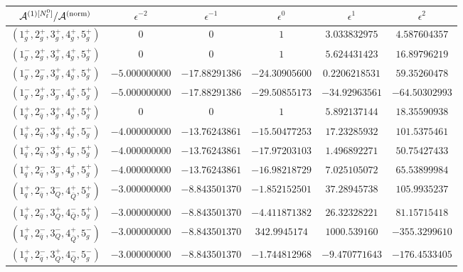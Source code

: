 \begin{table}[h]
  \centering
  \begin{adjustbox}{width=1\textwidth}
    \begin{tabular}{cccccc}
      \toprule
      $\mathcal{A}^{(1)[N_\mathrm{f}^0]}/\mathcal{A}^\mathrm{(norm)}$   &   $\epsilon^{-2}$   &   $\epsilon^{-1}$   &   $\epsilon^{0}$   &   $\epsilon^{1}$  &  $\epsilon^{2}$ \\
      \midrule
      $(1_g^+,2_g^+,3_g^+,4_g^+,5_g^+)$ & $0$ & $0$ & $1$ &
      $3.033832975$ & $4.587604357$ \\
      $(1_g^-,2_g^+,3_g^+,4_g^+,5_g^+)$ & $0$ & $0$ & $1$ &
      $5.624431423$ & $16.89796219$ \\
      $(1_g^-,2_g^-,3_g^+,4_g^+,5_g^+)$ &  $-5.000000000$ &
      $-17.88291386$ & $-24.30905600$ & $0.2206218531$ &
      $59.35260478$ \\
      $(1_g^-,2_g^+,3_g^-,4_g^+,5_g^+)$ &  $-5.000000000$ &
      $-17.88291386$ & $-29.50855173$ & $-34.92963561$ &
      $-64.50302993$ \\
      \midrule
      $(1_q^+,2_{\bar q}^-,3_g^+,4_g^+,5_g^+)$ & $0$ & $0$ & $1$ &
      $5.892137144$ & $18.35590938$ \\
      $(1_q^+,2_{\bar q}^-,3_g^+,4_g^+,5_g^-)$ & $-4.000000000$ &
      $-13.76243861$ & $-15.50477253$ & $17.23285932$ &
      $101.5375461$ \\
      $(1_q^+,2_{\bar q}^-,3_g^+,4_g^-,5_g^+)$ & $-4.000000000$ &
      $-13.76243861$ & $-17.97203103$ & $1.496892271$ &
      $50.75427433$ \\
      $(1_q^+,2_{\bar q}^-,3_g^-,4_g^+,5_g^+)$ & $-4.000000000$ &
      $-13.76243861$ & $-16.98218729$ & $7.025105072$ &
      $65.53899984$ \\
      \midrule
      $(1_q^+,2_{\bar q}^-,3_Q^-,4_{\bar Q}^+,5_g^+)$ &
      $-3.000000000$& $-8.843501370$ & $-1.852152501$ &
      $37.28945738$
      & $105.9935237$ \\
      $(1_q^+,2_{\bar q}^-,3_Q^+,4_{\bar Q}^-,5_g^+)$ &
      $-3.000000000$& $-8.843501370$ & $-4.411871382$ &
      $26.32328221$ & $81.15715418$ \\
      $(1_q^+,2_{\bar q}^-,3_Q^-,4_{\bar Q}^+,5_g^-)$ &
      $-3.000000000$& $-8.843501370$ & $342.9945174$ &
      $1000.539160$ & $-355.3299610$ \\
      $(1_q^+,2_{\bar q}^-,3_Q^+,4_{\bar Q}^-,5_g^-)$ &
      $-3.000000000$&
      $-8.843501370$ & $-1.744812968$ & $-9.470771643$ &
      $-176.4533405$ \\
      \toprule

\end{tabular}
\end{adjustbox}
\end{table}
